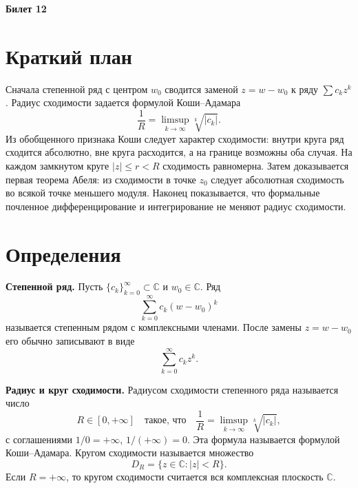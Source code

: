 \documentclass[12pt,a4paper]{article}
\newcommand{\CC}{\mathbb{C}}
\begin{document}
\begin{center}
{\Large\bfseries Билет 12}
\end{center}

\noindent{}

\section*{Краткий план}

Сначала степенной ряд с центром \(w_0\) сводится заменой \(z=w-w_0\) к ряду
\(\sum c_kz^k\). Радиус сходимости задается формулой Коши--Адамара
\[
  \frac1R=\limsup_{k\to\infty}\sqrt[k]{|c_k|}.
\]
Из обобщенного признака Коши следует характер сходимости: внутри круга ряд
сходится абсолютно, вне круга расходится, а на границе возможны оба случая.
На каждом замкнутом круге \(|z|\le r<R\) сходимость равномерна. Затем
доказывается первая теорема Абеля: из сходимости в точке \(z_0\) следует
абсолютная сходимость во всякой точке меньшего модуля. Наконец показывается,
что формальные почленное дифференцирование и интегрирование не меняют радиус
сходимости.

\section*{Определения}

\textbf{Степенной ряд.}
Пусть \(\{c_k\}_{k=0}^\infty\subset\CC\) и \(w_0\in\CC\). Ряд
\[
  \sum_{k=0}^{\infty}c_k(w-w_0)^k
\]
называется степенным рядом с комплексными членами. После замены \(z=w-w_0\)
его обычно записывают в виде
\[
  \sum_{k=0}^{\infty}c_kz^k.
\]

\textbf{Радиус и круг сходимости.}
Радиусом сходимости степенного ряда называется число
\[
  R\in[0,+\infty]\quad\text{такое, что}\quad
  \frac1R=\limsup_{k\to\infty}\sqrt[k]{|c_k|},
\]
с соглашениями \(1/0=+\infty\), \(1/(+\infty)=0\). Эта формула называется
формулой Коши--Адамара. Кругом сходимости называется множество
\[
  D_R=\{z\in\CC: |z|<R\}.
\]
Если \(R=+\infty\), то кругом сходимости считается вся комплексная плоскость
\(\CC\).
\end{document}
